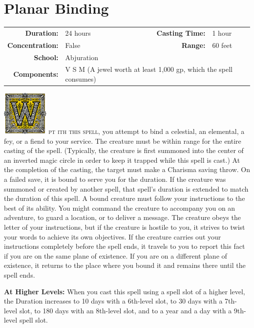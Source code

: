 \documentclass[12pt,showtrims]{memoir}
\begin{document}
\section*{Planar Binding}
{
\small\centering\vspace{-6pt}
\begin{tabular}{rlrl}
\toprule

\textbf{Duration:} & 24 hours &
\textbf{Casting Time:} & 1 hour \\
\textbf{Concentration:} & False &
\textbf{Range:} & 60 feet \\
\textbf{School:} & Abjuration \\
\textbf{Components:} & \multicolumn{3}{p{0.7\textwidth}}{V S M (A jewel worth at least 1,000 gp, which the spell consumes)}\\

\bottomrule
\end{tabular}
}
\noindent
\enlargethispage{2\baselineskip}
\lettrine[lines=4]{\includegraphics[height=63pt]{initials/W.png}}{ pt ith this spell}, you attempt to bind a celestial, an elemental, a fey, or a fiend to your service. The creature must be within range for the entire casting of the spell. (Typically, the creature is first summoned into the center of an inverted magic circle in order to keep it trapped while this spell is cast.) At the completion of the casting, the target must make a Charisma saving throw. On a failed save, it is bound to serve you for the duration. If the creature was summoned or created by another spell, that spell’s duration is extended to match the duration of this spell. A bound creature must follow your instructions to the best of its ability. You might command the creature to accompany you on an adventure, to guard a location, or to deliver a message. The creature obeys the letter of your instructions, but if the creature is hostile to you, it strives to twist your words to achieve its own objectives. If the creature carries out your instructions completely before the spell ends, it travels to you to report this fact if you are on the same plane of existence. If you are on a different plane of existence, it returns to the place where you bound it and remains there until the spell ends.

\vspace{8pt} \noindent\textbf{At Higher Levels:} When you cast this spell using a spell slot of a higher level, the Duration increases to 10 days with a 6th-level slot, to 30 days with a 7th-level slot, to 180 days with an 8th-level slot, and to a year and a day with a 9th-level spell slot.
\end{document}
